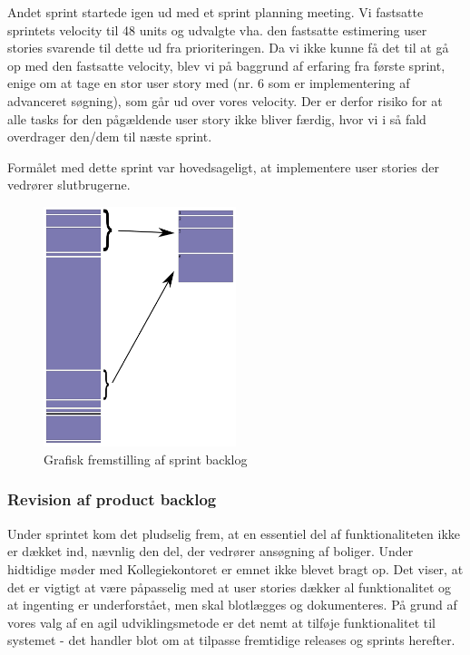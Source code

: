 \documentclass[12pt, a4paper]{report}
\begin{document}
Andet sprint startede igen ud med et sprint planning meeting. Vi fastsatte sprintets velocity til 48 units og udvalgte vha. den fastsatte estimering user stories svarende til dette ud fra prioriteringen. Da vi ikke kunne få det til at gå op med den fastsatte velocity, blev vi på baggrund af erfaring fra første sprint, enige om at tage en stor user story med (nr. 6 som er implementering af advanceret søgning), som går ud over vores velocity. Der er derfor risiko for at alle tasks for den pågældende user story ikke bliver færdig, hvor vi i så fald overdrager den/dem til næste sprint.

Formålet med dette sprint var hovedsageligt, at implementere user stories der vedrører slutbrugerne.

\begin{figure}
\includegraphics[width=0.5\textwidth]{sprint2log}
\caption{Grafisk fremstilling af sprint backlog}
\label{sprintlog2}
\end{figure}

\subsubsection{Revision af product backlog}

Under sprintet kom det pludselig frem, at en essentiel del af funktionaliteten ikke er dækket ind, nævnlig den del, der vedrører ansøgning af boliger. Under hidtidige møder med Kollegiekontoret er emnet ikke blevet bragt op. Det viser, at det er vigtigt at være påpasselig med at user stories dækker al funktionalitet og at ingenting er underforstået, men skal blotlægges og dokumenteres. På grund af vores valg af en agil udviklingsmetode er det nemt at tilføje funktionalitet til systemet - det handler blot om at tilpasse fremtidige releases og sprints herefter.
\end{document}
